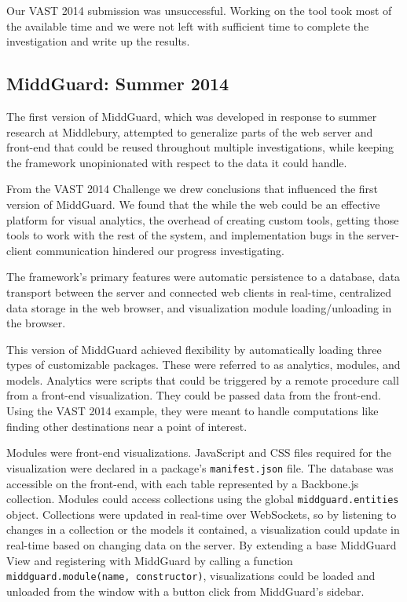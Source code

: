 \documentclass[midd]{thesis}
\begin{document}
Our VAST 2014 submission was unsuccessful. Working on the tool took most of the
available time and we were not left with sufficient time to complete the
investigation and write up the results.

\subsection{MiddGuard: Summer 2014}

The first version of MiddGuard, which was developed in response to summer
research at Middlebury, attempted to generalize parts of the web server and
front-end that could be reused throughout multiple investigations, while keeping
the framework unopinionated with respect to the data it could handle.

From the VAST 2014 Challenge we drew conclusions that influenced the first
version of MiddGuard. We found that the while the web could be an effective
platform for visual analytics, the overhead of creating custom tools, getting
those tools to work with the rest of the system, and implementation bugs in the
server-client communication hindered our progress investigating.

The framework's primary features were automatic persistence to a database, data
transport between the server and connected web clients in real-time, centralized
data storage in the web browser, and visualization module loading/unloading in
the browser.

This version of MiddGuard achieved flexibility by automatically loading three
types of customizable packages. These were referred to as analytics, modules,
and models. Analytics were scripts that could be triggered by a remote procedure
call from a front-end visualization. They could be passed data from the
front-end. Using the VAST 2014 example, they were meant to handle computations
like finding other destinations near a point of interest.

Modules were front-end visualizations. JavaScript and CSS files required for the
visualization were declared in a package's \texttt{manifest.json} file. The
database was accessible on the front-end, with each table represented by a
Backbone.js collection. Modules could access collections using the global
\texttt{middguard.entities} object. Collections were updated in real-time over
WebSockets, so by listening to changes in a collection or the models it
contained, a visualization could update in real-time based on changing data on
the server. By extending a base MiddGuard View \cite{backbone} and registering
with MiddGuard by calling a function \texttt{middguard.module(name,
constructor)}, visualizations could be loaded and unloaded from the window with
a button click from MiddGuard's sidebar.
\end{document}
